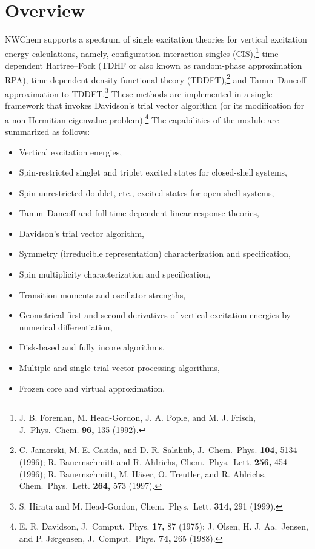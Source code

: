 \label{sec:tddft}

\section{Overview}

NWChem supports a spectrum of single excitation theories for
vertical excitation energy calculations, namely, configuration interaction
singles (CIS),\footnote{J. B. Foreman, M. Head-Gordon, J. A. Pople, and M. J. Frisch, J.\ Phys.\ Chem. {\bf 96,} 135 (1992).} 
time-dependent Hartree--Fock (TDHF or also known as 
random-phase approximation RPA), time-dependent density functional
theory (TDDFT),\footnote{C. Jamorski, M. E. Casida, and D. R. Salahub, J.\ Chem.\ Phys. {\bf 104,} 5134 (1996);
R. Bauernschmitt and R. Ahlrichs, Chem.\ Phys.\ Lett. {\bf 256,} 454 (1996); 
R. Bauernschmitt, M. H\"{a}ser, O. Treutler, and R. Ahlrichs, Chem.\ Phys.\ Lett. {\bf 264,} 573 (1997).} 
and Tamm--Dancoff approximation to TDDFT.\footnote{ S. Hirata and M. Head-Gordon, Chem.\ Phys.\ Lett. {\bf 314,} 291 (1999).}
These methods
are implemented in a single framework that invokes Davidson's trial vector
algorithm (or its modification for a non-Hermitian eigenvalue problem).\footnote{E. R. Davidson, J.\ Comput.\ Phys. {\bf 17,} 87 (1975); J. Olsen, H. J. Aa.\ Jensen, and P. J\o rgensen, J.\ Comput.\ Phys. {\bf 74,} 265 (1988).}
The capabilities of the module are summarized as follows:
\begin{itemize}
\item Vertical excitation energies,
\item Spin-restricted singlet and triplet excited states for closed-shell systems,
\item Spin-unrestricted doublet, etc., excited states for open-shell systems,
\item Tamm--Dancoff and full time-dependent linear response theories,
\item Davidson's trial vector algorithm,
\item Symmetry (irreducible representation) characterization and specification,
\item Spin multiplicity characterization and specification,
\item Transition moments and oscillator strengths,
\item Geometrical first and second derivatives of vertical excitation energies 
by numerical differentiation,
\item Disk-based and fully incore algorithms,
\item Multiple and single trial-vector processing algorithms,
\item Frozen core and virtual approximation.
\end{itemize}

